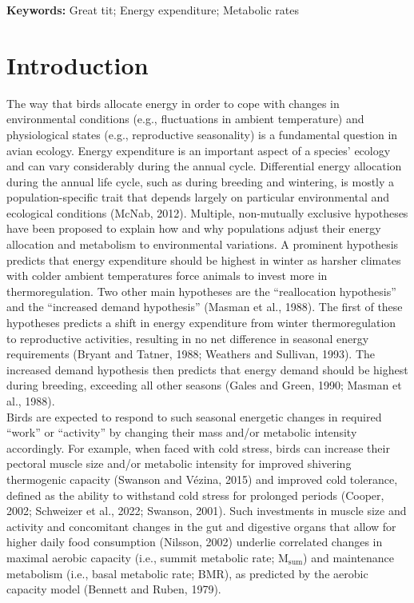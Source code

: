 \documentclass[10pt, twoside]{book} %
\begin{document}
\vspace*{\fill}
\noindent \textbf{Keywords:} Great tit; Energy expenditure; Metabolic rates
\clearpage

\section{Introduction}

The way that birds allocate energy in order to cope with changes in environmental conditions (e.g., fluctuations in ambient temperature) and physiological states (e.g., reproductive seasonality) is a fundamental question in avian ecology. Energy expenditure is an important aspect of a species' ecology and can vary considerably during the annual cycle. Differential energy allocation during the annual life cycle, such as during breeding and wintering, is mostly a population-specific trait that depends largely on particular environmental and ecological conditions (McNab, 2012). Multiple, non-mutually exclusive hypotheses have been proposed to explain how and why populations adjust their energy allocation and metabolism to environmental variations. A prominent hypothesis predicts that energy expenditure should be highest in winter as harsher climates with colder ambient temperatures force animals to invest more in thermoregulation. Two other main hypotheses are the “reallocation hypothesis” and the “increased demand hypothesis” (Masman et al., 1988). The first of these hypotheses predicts a shift in energy expenditure from winter thermoregulation to reproductive activities, resulting in no net difference in seasonal energy requirements (Bryant and Tatner, 1988; Weathers and Sullivan, 1993). The increased demand hypothesis then predicts that energy demand should be highest during breeding, exceeding all other seasons (Gales and Green, 1990; Masman et al., 1988).\\

Birds are expected to respond to such seasonal energetic changes in required “work” or “activity” by changing their mass and/or metabolic intensity accordingly. For example, when faced with cold stress, birds can increase their pectoral muscle size and/or metabolic intensity for improved shivering thermogenic capacity (Swanson and Vézina, 2015) and improved cold tolerance, defined as the ability to withstand cold stress for prolonged periods (Cooper, 2002; Schweizer et al., 2022; Swanson, 2001). Such investments in muscle size and activity and concomitant changes in the gut and digestive organs that allow for higher daily food consumption (Nilsson, 2002) underlie correlated changes in maximal aerobic capacity (i.e., summit metabolic rate; M$_{\text{sum}}$) and maintenance metabolism (i.e., basal metabolic rate; BMR), as predicted by the aerobic capacity model (Bennett and Ruben, 1979).\\
\end{document}
